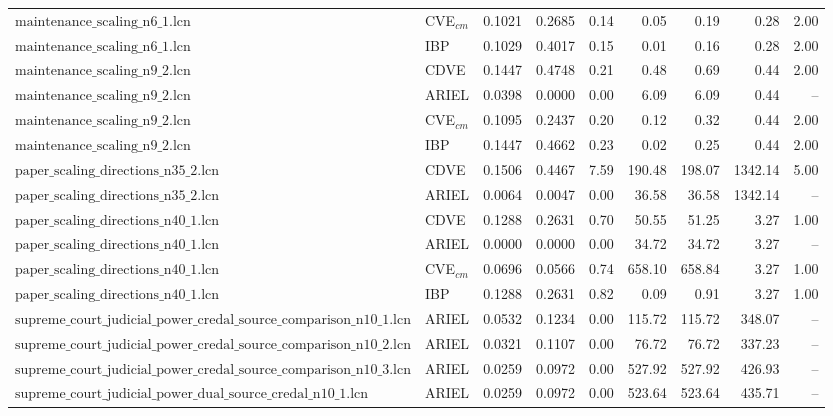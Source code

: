 \begin{table}[ht]
\begin{tabular}{llrrrrrrr}
$\text{maintenance\_scaling\_n6\_1.lcn}$ & CVE$_{cm}$ & 0.1021 & 0.2685 & 0.14 & 0.05 & 0.19 & 0.28 & 2.00 \\
$\text{maintenance\_scaling\_n6\_1.lcn}$ & IBP & 0.1029 & 0.4017 & 0.15 & 0.01 & 0.16 & 0.28 & 2.00 \\
\hline
$\text{maintenance\_scaling\_n9\_2.lcn}$ & CDVE & 0.1447 & 0.4748 & 0.21 & 0.48 & 0.69 & 0.44 & 2.00 \\
$\text{maintenance\_scaling\_n9\_2.lcn}$ & ARIEL & 0.0398 & 0.0000 & 0.00 & 6.09 & 6.09 & 0.44 & -- \\
$\text{maintenance\_scaling\_n9\_2.lcn}$ & CVE$_{cm}$ & 0.1095 & 0.2437 & 0.20 & 0.12 & 0.32 & 0.44 & 2.00 \\
$\text{maintenance\_scaling\_n9\_2.lcn}$ & IBP & 0.1447 & 0.4662 & 0.23 & 0.02 & 0.25 & 0.44 & 2.00 \\
\hline
$\text{paper\_scaling\_directions\_n35\_2.lcn}$ & CDVE & 0.1506 & 0.4467 & 7.59 & 190.48 & 198.07 & 1342.14 & 5.00 \\
$\text{paper\_scaling\_directions\_n35\_2.lcn}$ & ARIEL & 0.0064 & 0.0047 & 0.00 & 36.58 & 36.58 & 1342.14 & -- \\
\hline
$\text{paper\_scaling\_directions\_n40\_1.lcn}$ & CDVE & 0.1288 & 0.2631 & 0.70 & 50.55 & 51.25 & 3.27 & 1.00 \\
$\text{paper\_scaling\_directions\_n40\_1.lcn}$ & ARIEL & 0.0000 & 0.0000 & 0.00 & 34.72 & 34.72 & 3.27 & -- \\
$\text{paper\_scaling\_directions\_n40\_1.lcn}$ & CVE$_{cm}$ & 0.0696 & 0.0566 & 0.74 & 658.10 & 658.84 & 3.27 & 1.00 \\
$\text{paper\_scaling\_directions\_n40\_1.lcn}$ & IBP & 0.1288 & 0.2631 & 0.82 & 0.09 & 0.91 & 3.27 & 1.00 \\
\hline
$\text{supreme\_court\_judicial\_power\_credal\_source\_comparison\_n10\_1.lcn}$ & ARIEL & 0.0532 & 0.1234 & 0.00 & 115.72 & 115.72 & 348.07 & -- \\
\hline
$\text{supreme\_court\_judicial\_power\_credal\_source\_comparison\_n10\_2.lcn}$ & ARIEL & 0.0321 & 0.1107 & 0.00 & 76.72 & 76.72 & 337.23 & -- \\
\hline
$\text{supreme\_court\_judicial\_power\_credal\_source\_comparison\_n10\_3.lcn}$ & ARIEL & 0.0259 & 0.0972 & 0.00 & 527.92 & 527.92 & 426.93 & -- \\
\hline
$\text{supreme\_court\_judicial\_power\_dual\_source\_credal\_n10\_1.lcn}$ & ARIEL & 0.0259 & 0.0972 & 0.00 & 523.64 & 523.64 & 435.71 & -- \\
\hline

\end{tabular}
\end{table}
